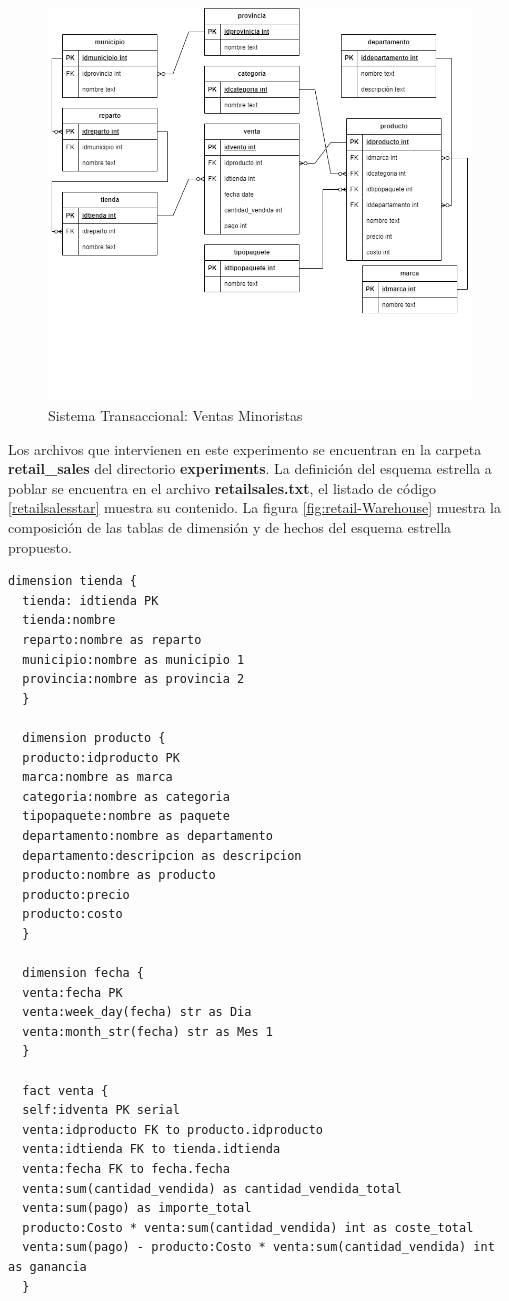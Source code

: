 \begin{figure}[ht]
    \centering
    \includegraphics[scale=0.5]{Graphics/retailSales-Transactional.drawio.png}
    \caption{Sistema Transaccional: Ventas Minoristas}
    \label{fig:retail-transactional}
  \end{figure}

Los archivos que intervienen en este experimento se encuentran en la carpeta \textbf{retail\_sales} del 
directorio \textbf{experiments}. La definición del esquema estrella a poblar se encuentra en el archivo 
\textbf{retailsales.txt}, el listado de código \ref{retailsalesstar} muestra su contenido. La figura \ref{fig:retail-Warehouse} muestra la composición de las 
tablas de dimensión y de hechos del esquema estrella propuesto. 

\begin{lstlisting}[label={retailsalesstar}, caption={Definici\'on del esquema estrella del almacén de datos asociado al escenario ventas minoristas}]
  dimension tienda {
  tienda: idtienda PK
  tienda:nombre
  reparto:nombre as reparto
  municipio:nombre as municipio 1
  provincia:nombre as provincia 2
  }

  dimension producto {
  producto:idproducto PK
  marca:nombre as marca
  categoria:nombre as categoria
  tipopaquete:nombre as paquete
  departamento:nombre as departamento
  departamento:descripcion as descripcion
  producto:nombre as producto
  producto:precio
  producto:costo
  }

  dimension fecha {
  venta:fecha PK
  venta:week_day(fecha) str as Dia
  venta:month_str(fecha) str as Mes 1
  }

  fact venta {
  self:idventa PK serial
  venta:idproducto FK to producto.idproducto 
  venta:idtienda FK to tienda.idtienda
  venta:fecha FK to fecha.fecha
  venta:sum(cantidad_vendida) as cantidad_vendida_total
  venta:sum(pago) as importe_total
  producto:Costo * venta:sum(cantidad_vendida) int as coste_total
  venta:sum(pago) - producto:Costo * venta:sum(cantidad_vendida) int as ganancia 
  }
\end{lstlisting}

